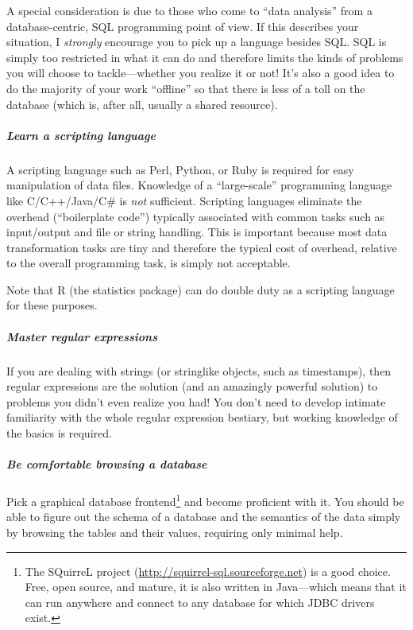 A special consideration is due to those who come to ``data analysis''
from a database-centric, SQL programming point of view. If this
describes your situation, I \emph{strongly} encourage you to pick up a
language besides SQL. SQL is simply too restricted in what it can do
and therefore limits the kinds of problems you will choose to
tackle---whether you realize it or not!  It's also a good idea to do
the majority of your work ``offline'' so that there is less of a toll
on the database (which is, after all, usually a shared resource).
\begin{unnumlist}
\subparagraph{Learn a scripting language}
\item A scripting language such as 
Perl, Python, or Ruby is required for easy manipulation of data files.
Knowledge of a ``large-scale'' programming language like
C/C++/Java/C\# is \emph{not} sufficient.  Scripting languages
eliminate the overhead (``boilerplate code'') typically associated
with common tasks such as input/output and file or string handling.
This is important because most data transformation tasks are tiny and
therefore the typical cost of overhead, relative to the overall
programming task, is simply not acceptable.\vspace*{6pt}

Note that R (the statistics package) can do double duty as a scripting
language for these purposes.

\subparagraph{Master regular expressions}
\item If you are dealing with  
strings (or stringlike objects, such as timestamps), then regular
expressions are the solution (and an amazingly powerful solution) to
problems you didn't even realize you had! You don't need to develop
intimate familiarity with the whole regular expression bestiary, but
working knowledge of the basics is required.\pagebreak

\subparagraph{Be comfortable browsing a database} \item Pick a graphical  
database frontend\footnote{The SQuirreL project
  (\url{http://squirrel-sql.sourceforge.net}) is a good choice. Free,
  open source, and mature, it is also written in Java---which means
  that it can run anywhere and connect to any database for which JDBC
  drivers exist.} and become proficient with it. You should be able to
figure out the schema of a database and the semantics of the data
simply by browsing the tables and their values, requiring only minimal
help.


\end{unnumlist}
